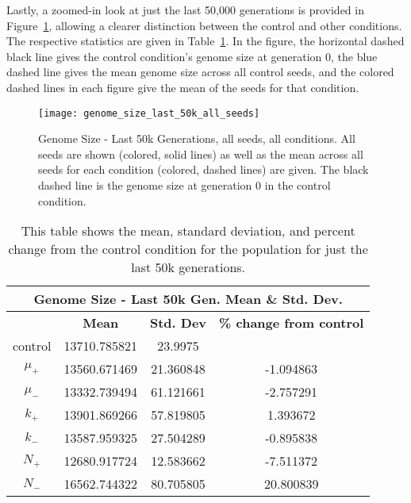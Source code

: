 Lastly, a zoomed-in look at just the last 50,000 generations is provided in Figure~\ref{fig:genome_size_last_50k}, allowing a clearer distinction between the control and other conditions. The respective statistics are given in Table~\ref{table:genome_size_stats_last_50k}. In the figure, the horizontal dashed black line gives the control condition's genome size at generation 0, the blue dashed line gives the mean genome size across all control seeds, and the colored dashed lines in each figure give the mean of the seeds for that condition. 
\begin{figure}[H]
	\centering
	\texttt{[image: genome\_size\_last\_50k\_all\_seeds]}
	\caption[Genome size - last 50k generations]{Genome Size - Last 50k Generations, all seeds, all conditions. All seeds are shown (colored, solid lines) as well as the mean across all seeds for each condition (colored, dashed lines) are given. The black dashed line is the genome size at generation 0 in the control condition.}
	\label{fig:genome_size_last_50k}
\end{figure}

\begin{table}[H]
	\begin{tabular}{|c|c|c|c|}
		\hline
		\multicolumn{4}{c}{\textbf{Genome Size - Last 50k Gen. Mean \& Std. Dev.}} \\
		\hline
		& \textbf{Mean} & \textbf{Std. Dev} & \textbf{\% change from control} \\
		\hline
		control & 13710.785821 & 23.9975 & \textemdash \\ 
		\hline
		$\mu_+$ & 13560.671469 & 21.360848 & -1.094863 \\ 
		\hline
		$\mu_-$ & 13332.739494 & 61.121661 & -2.757291 \\ 
		\hline
		$k_+$ & 13901.869266 & 57.819805 & 1.393672 \\ 
		\hline
		$k_-$ & 13587.959325 & 27.504289 & -0.895838 \\ 
		\hline
		$N_+$ & 12680.917724 & 12.583662 & -7.511372 \\ 
		\hline
		$N_-$ & 16562.744322 & 80.705805 & 20.800839 \\ 
		\hline
	\end{tabular}
	\caption[Genome size - last 50k generations mean \& std. dev.]{This table shows the mean, standard deviation, and percent change from the control condition for the population for just the last 50k generations.}
	\label{table:genome_size_stats_last_50k}
\end{table}


